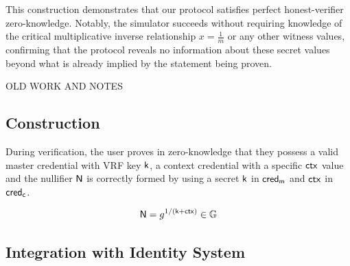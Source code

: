 This construction demonstrates that our protocol satisfies perfect honest-verifier zero-knowledge. Notably, the simulator succeeds without requiring knowledge of the critical multiplicative inverse relationship $x = \frac{1}{m}$ or any other witness values, confirming that the protocol reveals no information about these secret values beyond what is already implied by the statement being proven.








































\clearpage
OLD WORK AND NOTES







\subsection{Construction}
During verification, the user proves in zero-knowledge that they possess a valid master credential with VRF key $\mathsf{k}$, a context credential with a specific $\mathsf{ctx}$ value and the nullifier $\mathsf{N}$ is correctly formed by using a secret $\mathsf{k}$ in $\mathsf{cred_m}$ and $\mathsf{ctx}$ in $\mathsf{cred_c}$. 

\begin{equation}
\mathsf{N} = g^{1/(\mathsf{k} + \mathsf{ctx})} \in \mathbb{G}
\end{equation}

\subsection{Integration with Identity System}


